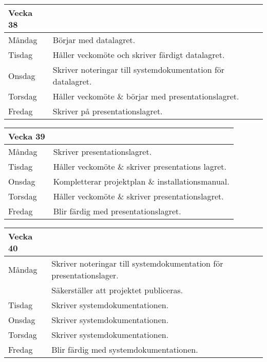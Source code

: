 \documentclass{TDP003mall}
\begin{document}
\begin{table}[!h]
    \begin{tabularx}{\textwidth}{l|l}
        Vecka 38\\\hline
        Måndag  & Börjar med datalagret.\\
        Tisdag  & Håller veckomöte och skriver färdigt datalagret.\\
        Onsdag  & Skriver noteringar till systemdokumentation för datalagret.\\
        Torsdag & Håller veckomöte \& börjar med presentationslagret.\\ %
        Fredag  & Skriver på presentationslagret.\\ %
    \end{tabularx}
\end{table}

\begin{table}[!h]
    \begin{tabularx}{\textwidth}{l|l}
        Vecka 39\\\hline
        Måndag  & Skriver presentationslagret.\\ %
        Tisdag  & Håller veckomöte \& skriver presentations lagret.\\ %
        Onsdag  & Kompletterar projektplan \& installationsmanual.\\
        Torsdag & Håller veckomöte \& skriver presentationslagret.\\ %
        Fredag  & Blir färdig med presentationslagret.\\ %
    \end{tabularx}
\end{table}

\begin{table}[!h]
    \begin{tabularx}{\textwidth}{l|l}
        Vecka 40\\\hline
        Måndag  & Skriver noteringar till systemdokumentation för presentationslager.\\
                & Säkerställer att projektet publiceras.\\
        Tisdag  & Skriver systemdokumentationen.\\ %
        Onsdag  & Skriver systemdokumentationen.\\
        Torsdag & Skriver systemdokumentationen.\\ %
        Fredag  & Blir färdig med systemdokumentationen.\\ %
    \end{tabularx}
\end{table}
\end{document}
